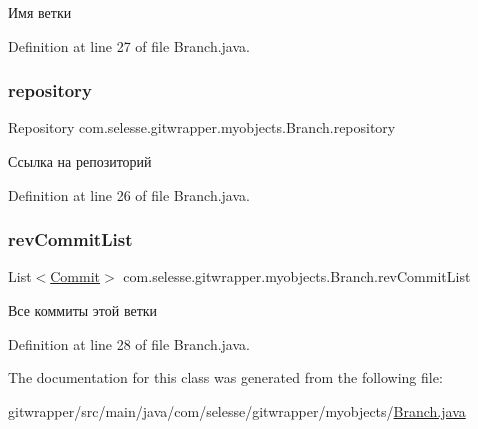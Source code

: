 Имя ветки 



Definition at line 27 of file Branch.\+java.

\mbox{\label{classcom_1_1selesse_1_1gitwrapper_1_1myobjects_1_1_branch_a8f6120f7811607f19fc5e97353713c27}} 
\subsubsection{\texorpdfstring{repository}{repository}}
{\footnotesize\ttfamily Repository com.\+selesse.\+gitwrapper.\+myobjects.\+Branch.\+repository\hspace{0.3cm}{\ttfamily [private]}}



Ссылка на репозиторий 



Definition at line 26 of file Branch.\+java.

\mbox{\label{classcom_1_1selesse_1_1gitwrapper_1_1myobjects_1_1_branch_ab687c3c9069725a9b3d47ad2a8c78d6b}} 
\subsubsection{\texorpdfstring{rev\+Commit\+List}{revCommitList}}
{\footnotesize\ttfamily List$<$\hyperlink{classcom_1_1selesse_1_1gitwrapper_1_1myobjects_1_1_commit}{Commit}$>$ com.\+selesse.\+gitwrapper.\+myobjects.\+Branch.\+rev\+Commit\+List\hspace{0.3cm}{\ttfamily [private]}}



Все коммиты этой ветки 



Definition at line 28 of file Branch.\+java.



The documentation for this class was generated from the following file\+:\begin{DoxyCompactItemize}
\item 
gitwrapper/src/main/java/com/selesse/gitwrapper/myobjects/\hyperlink{_branch_8java}{Branch.\+java}\end{DoxyCompactItemize}
